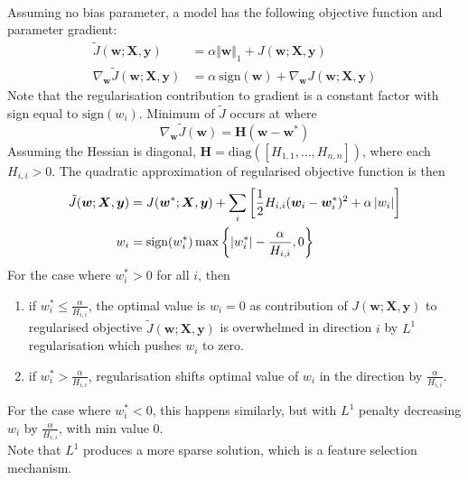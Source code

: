 \begin{definition} \\
Assuming no bias parameter, a model has the following objective function and parameter gradient:
\begin{align}
\tilde{J}(\bm{w}; \bm{X}, \bm{y}) &= \alpha \Vert \bm{w} \Vert_1 + J(\bm{w}; \bm{X}, \bm{y}) \nonumber \\
\nabla_{\bm{w}} \tilde{J}(\bm{w}; \bm{X}, \bm{y}) &= \alpha \ \text{sign}(\bm{w}) + \nabla_{\bm{w}} J(\bm{w}; \bm{X}, \bm{y}) \nonumber
\end{align}
Note that the regularisation contribution to gradient is a constant factor with sign equal to $\text{sign}(w_i)$. Minimum of $\tilde{J}$ occurs at where
\begin{equation}
\nabla_{\bm{w}} \tilde{J}(\bm{w}) = \bm{H} (\bm{w} - \bm{w}^*) \nonumber
\end{equation}
Assuming the Hessian is diagonal, $\bm{H} = \text{diag}([H_{1,1}, \ldots, H_{n,n}])$, where each $H_{i,i} > 0$. The quadratic approximation of regularised objective function is then
\begin{align}
\tilde{J}(\bm{w}; \bm{X}, \bm{y}) &= J(\bm{w}^*; \bm{X}, \bm{y}) + \sum_i \left[ \frac{1}{2} H_{i,i} (\bm{w}_i - \bm{w}_i^*)^2 + \alpha \left\lvert w_i\right\rvert \right] \nonumber \\
w_i &= \text{sign}(w_i^*) \max \left\{ \left\lvert w_i^*\right\rvert - \frac{\alpha}{H_{i,i}}, 0 \right\} \nonumber
\end{align}
For the case where $w_i^* > 0$ for all $i$, then
\begin{enumerate}[label=\roman*.]
\setlength{\itemsep}{0pt}
\item if $w_i^* \leq \frac{\alpha}{H_{i,i}}$, the optimal value is $w_i = 0$ as contribution of $J(\bm{w}; \bm{X}, \bm{y})$ to regularised objective $\tilde{J}(\bm{w}; \bm{X}, \bm{y})$ is overwhelmed in direction $i$ by $L^1$ regularisation which pushes $w_i$ to zero.
\item if $w_i^* > \frac{\alpha}{H_{i,i}}$, regularisation shifts optimal value of $w_i$ in the direction by $\frac{\alpha}{H_{i,i}}$.
\end{enumerate}
For the case where $w_i^* < 0$, this happens similarly, but with $L^1$ penalty decreasing $w_i$ by $\frac{\alpha}{H_{i,i}}$, with min value $0$.\\
Note that $L^1$ produces a more sparse solution, which is a feature selection mechanism.
\end{definition}